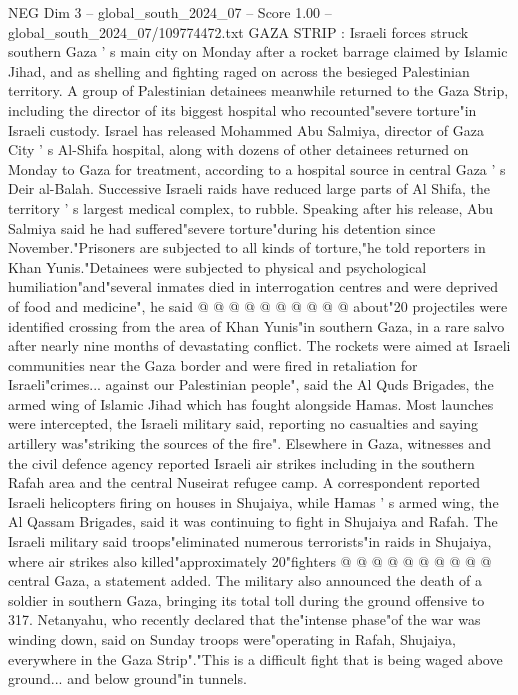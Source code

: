 \begin{textsample}{NEG Dim 3 – global\_south\_2024\_07 – Score 1.00 – global\_south\_2024\_07/109774472.txt}  \label{ex:f3_neg_146}
GAZA STRIP : Israeli forces struck southern Gaza ' s main city on Monday after a rocket barrage claimed by Islamic Jihad, and as shelling and fighting raged on across the besieged Palestinian territory.
A group of Palestinian detainees meanwhile returned to the Gaza Strip, including the director of its biggest hospital who recounted"severe torture"in Israeli custody.
Israel has released Mohammed Abu Salmiya, director of Gaza City ' s Al-Shifa hospital, along with dozens of other detainees returned on Monday to Gaza for treatment, according to a hospital source in central Gaza ' s Deir al-Balah.
Successive Israeli raids have reduced large parts of Al Shifa, the territory ' s largest medical complex, to rubble.
Speaking after his release, Abu Salmiya said he had suffered"severe torture"during his detention since November."Prisoners are subjected to all kinds of torture,"he told reporters in Khan Yunis."Detainees were subjected to physical and psychological humiliation"and"several inmates died in interrogation centres and were deprived of food and medicine", he said @ @ @ @ @ @ @ @ @ @ about"20 projectiles were identified crossing from the area of Khan Yunis"in southern Gaza, in a rare salvo after nearly nine months of devastating conflict.
The rockets were aimed at Israeli communities near the Gaza border and were fired in retaliation for Israeli"crimes... against our Palestinian people", said the Al Quds Brigades, the armed wing of Islamic Jihad which has fought alongside Hamas.
Most launches were intercepted, the Israeli military said, reporting no casualties and saying artillery was"striking the sources of the fire".
Elsewhere in Gaza, witnesses and the civil defence agency reported Israeli air strikes including in the southern Rafah area and the central Nuseirat refugee camp.
A correspondent reported Israeli helicopters firing on houses in Shujaiya, while Hamas ' s armed wing, the Al Qassam Brigades, said it was continuing to fight in Shujaiya and Rafah.
The Israeli military said troops"eliminated numerous terrorists"in raids in Shujaiya, where air strikes also killed"approximately 20"fighters @ @ @ @ @ @ @ @ @ @ central Gaza, a statement added.
The military also announced the death of a soldier in southern Gaza, bringing its total toll during the ground offensive to 317.
Netanyahu, who recently declared that the"intense phase"of the war was winding down, said on Sunday troops were"operating in Rafah, Shujaiya, everywhere in the Gaza Strip"."This is a difficult fight that is being waged above ground... and below ground"in tunnels.

\end{textsample}
